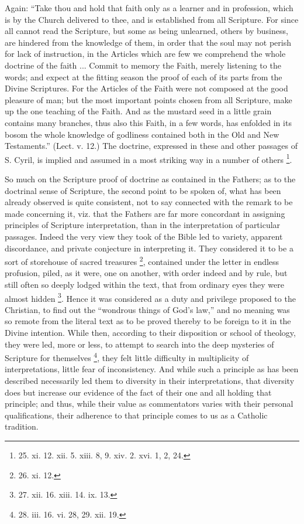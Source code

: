 Again: ``Take thou and hold
that faith only as a learner and in profession, which is by the Church
delivered to thee, and is established from all Scripture. For since
all cannot read the Scripture, but some as being unlearned, others by
business, are hindered from the knowledge of them, in order that the
soul may not perish for lack of instruction, in the Articles which are
few we comprehend the whole doctrine of the faith ... Commit to memory
the Faith, merely listening to the words; and expect at the fitting
season the proof of each of its parts from the Divine
Scriptures. For the Articles of the Faith were not composed at the
good pleasure of man; but the most important points chosen from all
Scripture, make up the one teaching of the Faith. And as the mustard
seed in a little grain contains many branches, thus also this Faith,
in a few words, has enfolded in its bosom the whole knowledge of
godliness contained both in the Old and New Testaments.'' (Lect. v.
12.) The doctrine, expressed in these and other passages of S. Cyril,
is implied and assumed in a most striking way in a number of others \footnote{25. xi.
12. xii. 5. xiii. 8, 9. xiv. 2. xvi. 1, 2, 24.}.

So much on the Scripture proof
of doctrine as contained in the Fathers; as to the doctrinal sense of
Scripture, the second point to be spoken of, what has been already
observed is quite consistent, not to say connected with the remark to
be made concerning it, viz. that the Fathers are far more concordant
in assigning principles of Scripture interpretation, than in the
interpretation of particular passages. Indeed the very view they took
of the Bible led to variety, apparent discordance, and private
conjecture in interpreting it. They considered it to be a sort of
storehouse of sacred treasures \footnote{26. xi.
12.}, contained under the letter in endless profusion, piled, as it
were, one on another, with order indeed and by rule, but still often
so deeply lodged within the text, that from ordinary eyes they were
almost hidden \footnote{27. xii.
16. xiii. 14. ix. 13.}. Hence
it was considered as a duty and privilege proposed to the Christian,
to find out the ``wondrous things of God's law,'' and no meaning was so
remote from the literal text as to be proved thereby to be foreign to
it in the Divine intention. While then, according to their disposition
or school of theology, they were led, more or less, to attempt to
search into the deep mysteries of Scripture for themselves \footnote{28. iii.
16. vi. 28, 29. xii. 19.}, they felt little difficulty in multiplicity of
interpretations, little fear of inconsistency. And while such a
principle as has been described necessarily led them to diversity
in their interpretations, that diversity does but increase our
evidence of the fact of their one and all holding that principle; and
thus, while their value as commentators varies with their personal
qualifications, their adherence to that principle comes to us as a
Catholic tradition.

